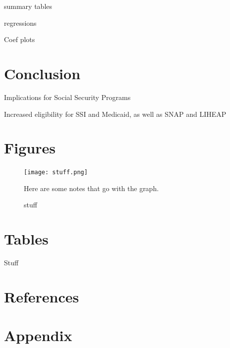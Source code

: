 \documentclass[12pt]{article}
\begin{document}
summary tables

regressions

Coef plots
 

 
  

\section{Conclusion}
 
Implications for Social Security Programs
 
Increased eligibility for SSI and Medicaid, as well as SNAP and LIHEAP
 

\section{Figures}
 
 

\begin{figure}[!ht]\label{stuff}
\caption{stuff}
\centering
\texttt{[image: stuff.png]}
\medskip 
\begin{minipage}{0.65\textwidth} 
{\footnotesize Here are some notes that go with the graph.  \par}
\end{minipage}
\end{figure}

\newpage
 
\section{Tables}
 

 

\begin{table}[!h]
\caption{Stuff}
\label{tab:newtable}
 \scalebox{0.55}{   }
\end{table} 
 
  



 
\clearpage


\section*{References}
\renewcommand*{\refname}{\vspace*{-12mm}} 




\section*{Appendix}
\clearpage
 

 
\end{document}

